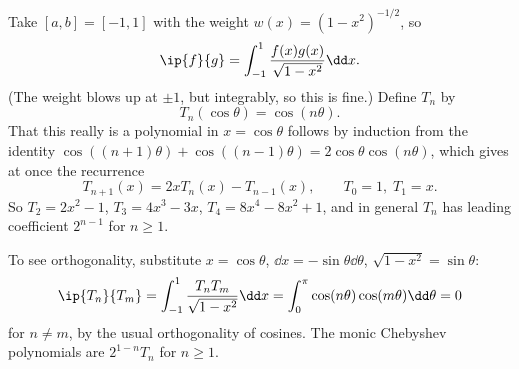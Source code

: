 \begin{example}
  Take $[a,b] = [-1,1]$ with the weight $w(x) = (1-x^2)^{-1/2}$, so
  $$
  \ip{f}{g} = \int_{-1}^{1}\frac{f(x)g(x)}{\sqrt{1-x^2}}\dd x.
  $$
  (The weight blows up at $\pm 1$, but integrably, so this is fine.) Define $T_n$ by
  $$
  T_n(\cos\theta) = \cos(n\theta).
  $$
  That this really is a polynomial in $x = \cos\theta$ follows by induction from the identity $\cos((n+1)\theta) + \cos((n-1)\theta) = 2\cos\theta\cos(n\theta)$, which gives at once the recurrence
  $$
  T_{n+1}(x) = 2xT_n(x) - T_{n-1}(x), \qquad T_0 = 1, \; T_1 = x.
  $$
  So $T_2 = 2x^2 - 1$, $T_3 = 4x^3 - 3x$, $T_4 = 8x^4 - 8x^2 + 1$, and in general $T_n$ has leading coefficient $2^{n-1}$ for $n \geq 1$.

  To see orthogonality, substitute $x = \cos\theta$, $\dd x = -\sin\theta \dd\theta$, $\sqrt{1-x^2} = \sin\theta$:
  $$
  \ip{T_n}{T_m} = \int_{-1}^{1}\frac{T_n T_m}{\sqrt{1-x^2}}\dd x = \int_0^\pi \cos(n\theta)\cos(m\theta)\dd\theta = 0
  $$
  for $n \neq m$, by the usual orthogonality of cosines. The monic Chebyshev polynomials are $2^{1-n}T_n$ for $n \ge 1$.
\end{example}

